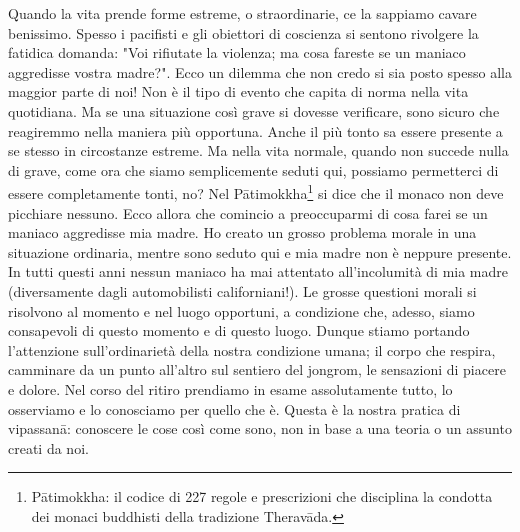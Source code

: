 Quando la vita prende forme estreme, o straordinarie, ce la sappiamo
cavare benissimo. Spesso i pacifisti e gli obiettori di coscienza si
sentono rivolgere la fatidica domanda: "Voi rifiutate la violenza; ma
cosa fareste se un maniaco aggredisse vostra madre?". Ecco un dilemma
che non credo si sia posto spesso alla maggior parte di noi! Non è il
tipo di evento che capita di norma nella vita quotidiana. Ma se una
situazione così grave si dovesse verificare, sono sicuro che reagiremmo
nella maniera più opportuna. Anche il più tonto sa essere presente a se
stesso in circostanze estreme. Ma nella vita normale, quando non succede
nulla di grave, come ora che siamo semplicemente seduti qui, possiamo
permetterci di essere completamente tonti, no? Nel Pātimokkha\footnote{Pātimokkha: il codice di 227 regole e prescrizioni che
disciplina la condotta dei monaci buddhisti della tradizione Theravāda.}
si dice che il monaco non deve picchiare nessuno. Ecco allora che
comincio a preoccuparmi di cosa farei se un maniaco aggredisse mia
madre. Ho creato un grosso problema morale in una situazione ordinaria,
mentre sono seduto qui e mia madre non è neppure presente. In tutti
questi anni nessun maniaco ha mai attentato all'incolumità di mia madre
(diversamente dagli automobilisti californiani!). Le grosse questioni
morali si risolvono al momento e nel luogo opportuni, a condizione che,
adesso, siamo consapevoli di questo momento e di questo luogo.
Dunque stiamo portando l'attenzione sull'ordinarietà della nostra
condizione umana; il corpo che respira, camminare da un punto all'altro
sul sentiero del jongrom, le sensazioni di piacere e dolore. Nel corso
del ritiro prendiamo in esame assolutamente tutto, lo osserviamo e lo
conosciamo per quello che è. Questa è la nostra pratica di vipassanā:
conoscere le cose così come sono, non in base a una teoria o un assunto
creati da noi.

